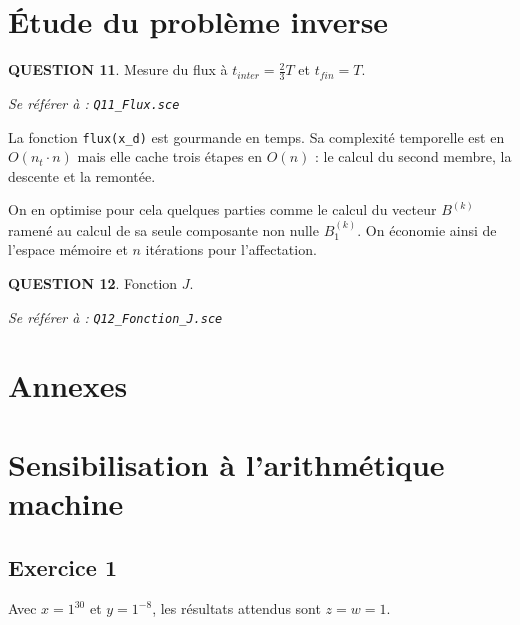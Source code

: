 \documentclass[a4paper,11pt]{article}
\newcommand{\quest}[1]{\small\textbf{#1}\normalsize}
\theoremstyle{nonumberplain}
\theoremstyle{nonumberplain}
\theoremstyle{nonumberplain}
\begin{document}
\medskip
\section{\'{E}tude du problème inverse}

    \quest{QUESTION 11}. Mesure du flux à $t_{inter} = \frac{2}{3} T$ et $t_{fin} = T$.
    \begin{ref_scilab}
        \emph{Se référer à :} \texttt{\emph{Q11\_Flux.sce}}
    \end{ref_scilab}

    La fonction \texttt{flux(x\_d)} est gourmande en temps.
    Sa complexité temporelle est en $O(n_t \cdot n)$ mais elle cache trois
    étapes en $O(n)$ : le calcul du second membre, la descente et la remontée.

    \medskip
    On en optimise pour cela quelques parties comme le calcul du vecteur $B^{(k)}$ ramené
    au calcul de sa seule composante non nulle $B_1^{(k)}$. On économie ainsi de l'espace mémoire
    et $n$ itérations pour l'affectation.

    \newpage\quest{QUESTION 12}. Fonction $J$.
    \begin{ref_scilab}
        \emph{Se référer à :} \texttt{\emph{Q12\_Fonction_J.sce}}
    \end{ref_scilab}

\section*{Annexes}

\vspace{8cm}

\section{Sensibilisation à l'arithmétique machine}
\subsection*{Exercice 1}

    Avec $x = 1^{30}$ et $y = 1^{-8}$, les résultats attendus sont $z = w = 1$.
\end{document}
